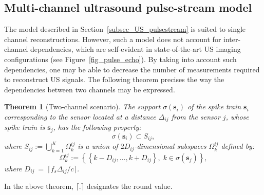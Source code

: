 \documentclass[journal]{IEEEtran}
\newtheorem{theorem}{Theorem}
\newcommand{\vect}[1]{\bm{#1}}
\newcommand{\ser}[2]{#1^{#2}}
\theoremstyle{definition}
\begin{document}
\subsection{Multi-channel ultrasound pulse-stream model}
\label{subsec_US_multiplechannels}
The model described in Section~\ref{subsec_US_pulsestream} is suited to single channel reconstructions. However, such a model does not account for inter-channel dependencies, which are self-evident in state-of-the-art US imaging configurations (see Figure~\ref{fig_pulse_echo}). By taking into account such dependencies, one may be able to decrease the number of measurements required to reconstruct US signals.
The following theorem precises the way the dependencies between two channels may be expressed.
\begin{theorem}[Two-channel scenario]
\label{th_2sens_subspace}
The support $\sigma \left(\vect{s}_i\right)$ of the spike train $\vect{s}_i$ corresponding to the sensor located at a distance $\Delta_{ij}$ from the sensor $j$, whose spike train is $\vect{s}_j$, has the following property:
	\begin{equation*}
		\sigma \left(\vect{s}_i\right) \subset S_{ij},
	\end{equation*}
	where $S_{ij} := \bigcup \limits_{k=1}^K \ser{\Omega_k}{ij}$ is a union of $2 D_{ij}$-dimensional subspaces $\ser{\Omega_k}{ij}$ defined by: 
	\begin{equation*}
		\ser{\Omega_k}{ij} := \left \lbrace \left \lbrace k - D_{ij},\dots, k+ D_{ij} \right\rbrace, \; k \in \sigma \left(\vect{s}_{j}\right) \right\rbrace,
	\end{equation*}
	where $D_{ij}~=~\lceil f_s \Delta_{ij}/ c  \rceil$. 
\end{theorem}
In the above theorem, $\lceil.\rceil$ designates the round value.
\end{document}
